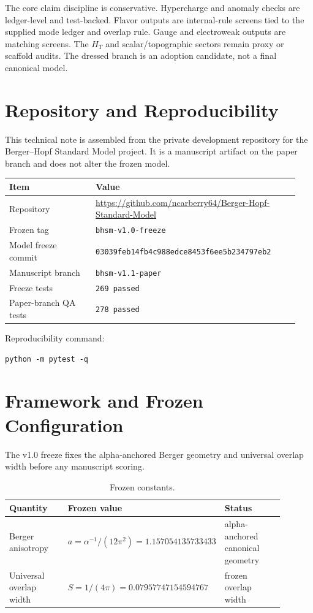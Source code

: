 \documentclass[11pt]{article}
\newcommand{\HT}{\ensuremath{H_T}}
\newcommand{\CommitHash}{\texttt{03039feb14fb4c988edce}\allowbreak\texttt{8453f6ee5b234797eb2}}
\newcommand{\RepoURL}{\url{https://github.com/ncarberry64/Berger-Hopf-Standard-Model}}
\begin{document}
The core claim discipline is conservative. Hypercharge and anomaly checks are
ledger-level and test-backed. Flavor outputs are internal-rule screens tied to
the supplied mode ledger and overlap rule. Gauge and electroweak outputs are
matching screens. The \HT{} and scalar/topographic sectors remain proxy or
scaffold audits. The dressed branch is an adoption candidate, not a final
canonical model.

\section{Repository and Reproducibility}

This technical note is assembled from the private development repository for
the Berger--Hopf Standard Model project. It is a manuscript artifact on the
paper branch and does not alter the frozen model.

\begin{longtable}{@{}L{0.28\linewidth}L{0.66\linewidth}@{}}
\toprule
Item & Value \\
\midrule
Repository & \RepoURL{} \\
Frozen tag & \texttt{bhsm-v1.0-freeze} \\
Model freeze commit & \CommitHash{} \\
Manuscript branch & \texttt{bhsm-v1.1-paper} \\
Freeze tests & \texttt{269 passed} \\
Paper-branch QA tests & \texttt{278 passed} \\
\bottomrule
\end{longtable}

Reproducibility command:
\begin{verbatim}
python -m pytest -q
\end{verbatim}

\section{Framework and Frozen Configuration}

The v1.0 freeze fixes the alpha-anchored Berger geometry and universal overlap
width before any manuscript scoring.

\begin{table}[htbp]
\centering
\caption{Frozen constants.}
\small
\begin{tabular}{@{}L{0.25\linewidth}L{0.37\linewidth}L{0.27\linewidth}@{}}
\toprule
Quantity & Frozen value & Status \\
\midrule
Berger anisotropy & $a=\alpha^{-1}/(12\pi^2)=1.157054135733433$ & alpha-anchored canonical geometry \\
Universal overlap width & $S=1/(4\pi)=0.07957747154594767$ & frozen overlap width \\
\bottomrule
\end{tabular}
\end{table}
\end{document}
